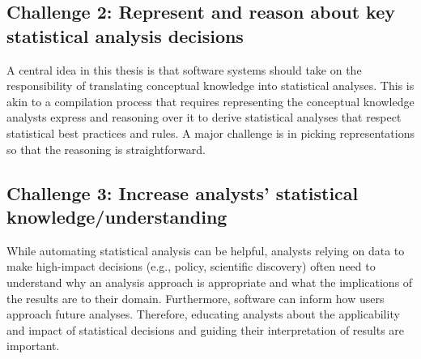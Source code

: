 


\subsection{Challenge 2: Represent and reason about key statistical analysis decisions} %
A central idea in this thesis is that software systems should take on the
responsibility of translating conceptual knowledge into statistical analyses.
This is akin to a compilation process that requires representing the conceptual
knowledge analysts express and reasoning over it to derive statistical
analyses that respect statistical best practices and rules. A
major challenge is in picking representations so that the reasoning is straightforward. 

\subsection{Challenge 3: Increase analysts' statistical knowledge/understanding} %
While automating statistical analysis can be helpful, analysts relying on data
to make high-impact decisions (e.g., policy, scientific discovery) often need to
understand why an analysis approach is appropriate and what the implications of
the results are to their domain. Furthermore, software can inform how users
approach future analyses. Therefore, educating analysts about the applicability
and impact of statistical decisions and guiding their interpretation of results
are important.


